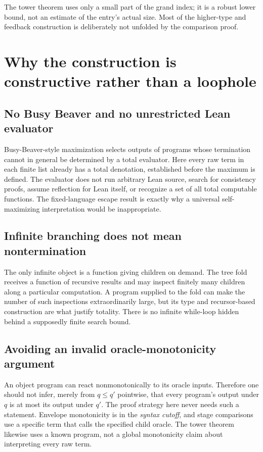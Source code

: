 \documentclass[11pt]{article}
\theoremstyle{definition}
\begin{document}
The tower theorem uses only a small part of the grand index; it is a robust
lower bound, not an estimate of the entry's actual size. Most of the
higher-type and feedback construction is deliberately not unfolded by the
comparison proof.

\section{Why the construction is constructive rather than a loophole}
\label{sec:safety}

\subsection{No Busy Beaver and no unrestricted Lean evaluator}

Busy-Beaver-style maximization selects outputs of programs whose termination
cannot in general be determined by a total evaluator. Here every raw term
in each finite list already has a total denotation, established before the
maximum is defined. The evaluator does not run arbitrary Lean source,
search for consistency proofs, assume reflection for Lean itself, or
recognize a set of all total computable functions. The fixed-language escape
result is exactly why a universal self-maximizing interpretation would be
inappropriate.

\subsection{Infinite branching does not mean nontermination}

The only infinite object is a function giving children on demand. The tree
fold receives a function of recursive results and may inspect finitely many
children along a particular computation. A program supplied to the fold can
make the number of such inspections extraordinarily large, but its type and
recursor-based construction are what justify totality. There is no infinite
while-loop hidden behind a supposedly finite search bound.

\subsection{Avoiding an invalid oracle-monotonicity argument}

An object program can react nonmonotonically to its oracle inputs. Therefore
one should not infer, merely from $q\le q'$ pointwise, that every program's
output under $q$ is at most its output under $q'$. The proof strategy here
never needs such a statement. Envelope monotonicity is in the \emph{syntax
cutoff}, and stage comparisons use a specific term that calls the specified
child oracle. The tower theorem likewise uses a known program, not a global
monotonicity claim about interpreting every raw term.
\end{document}
